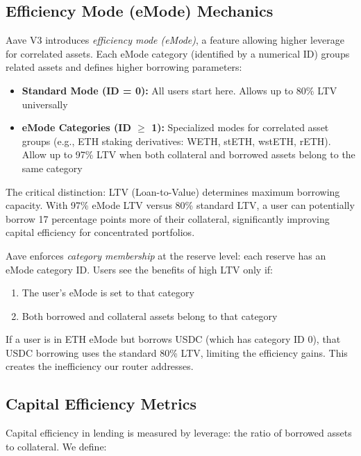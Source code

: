 \subsection{Efficiency Mode (eMode) Mechanics}\label{sec:emode-mechanics}

Aave V3 introduces \textit{efficiency mode (eMode)}, a feature allowing higher leverage for correlated assets. Each eMode category (identified by a numerical ID) groups related assets and defines higher borrowing parameters:

\begin{itemize}
    \item \textbf{Standard Mode (ID = 0):} All users start here. Allows up to 80\% LTV universally
    \item \textbf{eMode Categories (ID $\geq$ 1):} Specialized modes for correlated asset groups (e.g., ETH staking derivatives: WETH, stETH, wstETH, rETH). Allow up to 97\% LTV when both collateral and borrowed assets belong to the same category
\end{itemize}

The critical distinction: LTV (Loan-to-Value) determines maximum borrowing capacity. With 97\% eMode LTV versus 80\% standard LTV, a user can potentially borrow 17 percentage points more of their collateral, significantly improving capital efficiency for concentrated portfolios.

Aave enforces \textit{category membership} at the reserve level: each reserve has an eMode category ID. Users see the benefits of high LTV only if:
\begin{enumerate}
    \item The user's eMode is set to that category
    \item Both borrowed and collateral assets belong to that category
\end{enumerate}

If a user is in ETH eMode but borrows USDC (which has category ID 0), that USDC borrowing uses the standard 80\% LTV, limiting the efficiency gains. This creates the inefficiency our router addresses.

\subsection{Capital Efficiency Metrics}\label{sec:capital-efficiency}

Capital efficiency in lending is measured by leverage: the ratio of borrowed assets to collateral. We define:


